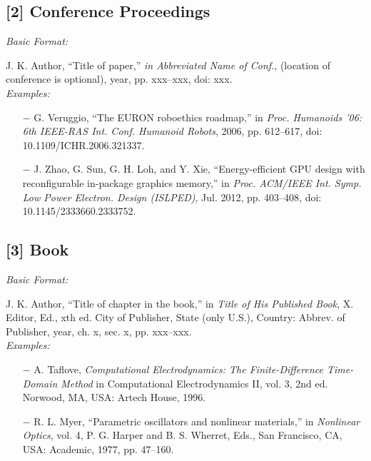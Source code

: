 \documentclass{telkomnika}
\begin{document}
\subsection*{[2]	Conference Proceedings}
\footnotesize
\begin{flushleft}
\textsl{Basic Format:\\}
\end{flushleft}
\vspace{-1.1em} 
J. K. Author, “Title of paper,” \textsl{in Abbreviated Name of Conf.}, (location of conference is optional), year, pp. xxx–xxx, doi: xxx. \\
\emph{Examples:}
\begin{enumerate} [leftmargin=*, topsep=0.3ex, itemsep=0.3ex, parsep=0.2ex]
\footnotesize
\item[$-$] G. Veruggio, “The EURON roboethics roadmap,” in \textsl{Proc. Humanoids ’06: 6th IEEE-RAS Int. Conf. Humanoid Robots}, 2006, pp. 612–617, doi: 10.1109/ICHR.2006.321337. 
\item[$-$]	J. Zhao, G. Sun, G. H. Loh, and Y. Xie, “Energy-efficient GPU design with reconfigurable in-package graphics memory,” in \textsl{Proc. ACM/IEEE Int. Symp. Low Power Electron. Design (ISLPED)}, Jul. 2012, pp. 403–408, doi: 10.1145/2333660.2333752.
\end{enumerate}


\subsection*{[3] Book}
\footnotesize
\begin{flushleft}
\textsl{Basic Format:\\}
\end{flushleft}
\vspace{-1.1em} 
\footnotesize
J. K. Author, “Title of chapter in the book,” in \textsl{Title of His Published Book}, X. Editor, Ed., xth ed. City of Publisher, State (only U.S.), Country: Abbrev. of Publisher, year, ch. x, sec. x, pp. xxx–xxx. \\
\textsl{Examples:}
\begin{enumerate} [leftmargin=*, topsep=0.3ex, itemsep=0.3ex, parsep=0.2ex]
\footnotesize
    \item[$-$] A. Taflove, \textsl{Computational Electrodynamics: The Finite-Difference Time-Domain Method} in Computational Electrodynamics II, vol. 3, 2nd ed. Norwood, MA, USA: Artech House, 1996. 
		\item[$-$] R. L. Myer, “Parametric oscillators and nonlinear materials,” in \textsl{Nonlinear Optics}, vol. 4, P. G. Harper and B. S. Wherret, Eds., San Francisco, CA, USA: Academic, 1977, pp. 47–160.
\end{enumerate}
\end{document}
